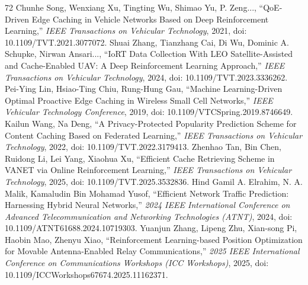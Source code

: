 \documentclass[journal]{IEEEtran}
\begin{document}
\begin{thebibliography}{72}
Chunhe Song, Wenxiang Xu, Tingting Wu, Shimao Yu, P. Zeng..., ``QoE-Driven Edge Caching in Vehicle Networks Based on Deep Reinforcement Learning,'' \textit{IEEE Transactions on Vehicular Technology}, 2021, doi: 10.1109/TVT.2021.3077072.
Shuai Zhang, Tianzhang Cai, Di Wu, Dominic A. Schupke, Nirwan Ansari..., ``IoRT Data Collection With LEO Satellite-Assisted and Cache-Enabled UAV: A Deep Reinforcement Learning Approach,'' \textit{IEEE Transactions on Vehicular Technology}, 2024, doi: 10.1109/TVT.2023.3336262.
Pei-Ying Lin, Hsiao-Ting Chiu, Rung-Hung Gau, ``Machine Learning-Driven Optimal Proactive Edge Caching in Wireless Small Cell Networks,'' \textit{IEEE Vehicular Technology Conference}, 2019, doi: 10.1109/VTCSpring.2019.8746649.
Kailun Wang, Na Deng, ``A Privacy-Protected Popularity Prediction Scheme for Content Caching Based on Federated Learning,'' \textit{IEEE Transactions on Vehicular Technology}, 2022, doi: 10.1109/TVT.2022.3179413.
Zhenhao Tan, Bin Chen, Ruidong Li, Lei Yang, Xiaohua Xu, ``Efficient Cache Retrieving Scheme in VANET via Online Reinforcement Learning,'' \textit{IEEE Transactions on Vehicular Technology}, 2025, doi: 10.1109/TVT.2025.3532836.
Hind Gamil A. Elrahim, N. A. Malik, Kamaludin Bin Mohamad Yusof, ``Efficient Network Traffic Prediction: Harnessing Hybrid Neural Networks,'' \textit{2024 IEEE International Conference on Advanced Telecommunication and Networking Technologies (ATNT)}, 2024, doi: 10.1109/ATNT61688.2024.10719303.
Yuanjun Zhang, Lipeng Zhu, Xian-song Pi, Haobin Mao, Zhenyu Xiao, ``Reinforcement Learning-based Position Optimization for Movable Antenna-Enabled Relay Communications,'' \textit{2025 IEEE International Conference on Communications Workshops (ICC Workshops)}, 2025, doi: 10.1109/ICCWorkshops67674.2025.11162371.


\end{thebibliography}
\end{document}
